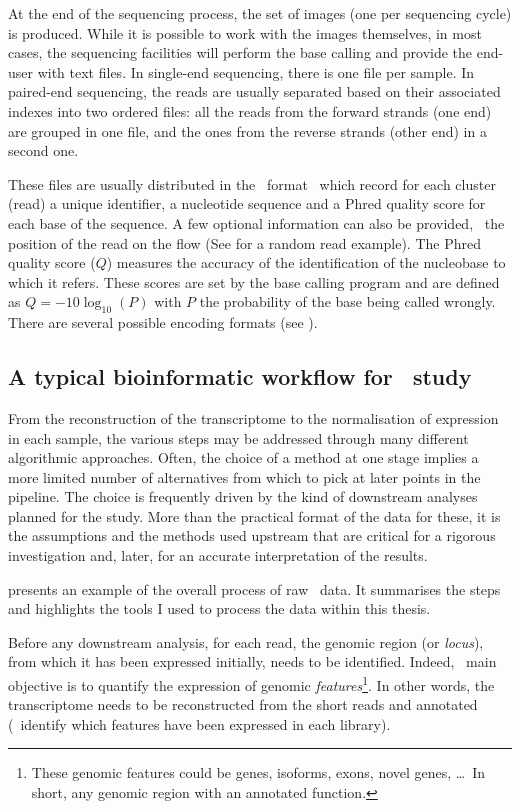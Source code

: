 At the end of the sequencing process, the set of images (one per sequencing cycle)
is produced. While it is possible to work with the images themselves, in most
cases, the sequencing facilities will perform the base calling and provide the
end-user with text files. In single-end sequencing, there is one file per sample.
In paired-end sequencing, the reads are usually separated based on their associated
indexes into two ordered files: all the reads from the forward strands (one end)
are grouped in one file, and the ones from the reverse strands (other end)
in a second one.

These files are usually distributed in the \fastq\ format~
which record for each cluster (read) a unique identifier,
a nucleotide sequence and a \gls{Phred} quality score for each base of the
sequence. A few optional information can also be provided, \eg\
the position of the read on the \gls{flow} (See  for
a random read example).
The \gls{Phred} quality score ($Q$) measures the accuracy of the identification
of the nucleobase to which it refers. These scores are set by the base calling
program and are defined as $Q = -10\log_{10}(P)$ with $P$ the probability of
the base being called wrongly. There are several possible encoding formats
(see \Cref{sec:PhredScore}).

\subsection{A typical bioinformatic workflow for \Rnaseq\ study\quad}\label{sub:RNAseqworflow}

From the reconstruction of the
transcriptome to the normalisation of expression in each sample, the various
steps may be addressed through many different algorithmic approaches.
Often, the choice of a method at one stage implies a more limited number of
alternatives from which to pick at later points in the pipeline.
The choice is frequently driven by the kind of downstream analyses planned for
the study. More than the practical format of the data for these, it is the
assumptions and the methods used upstream that are critical for a
rigorous investigation and, later, for an accurate interpretation of the results.

 presents an example of the overall 
process of raw \Rnaseq\ data. It summarises the steps and highlights the tools
I used to process the data within this thesis.

Before any downstream analysis, for each read, the genomic region (or
\emph{locus}), from which it has been expressed initially, needs to be identified.
Indeed, \Rnaseq\ main objective is to quantify the expression of genomic
\emph{features}\footnote{These genomic features could be genes, isoforms,
exons, novel genes, \dots\
In short, any genomic region with an annotated function.}. In other words,
the transcriptome needs to be reconstructed from the short reads and annotated
(\ie\ identify which features have been expressed in each library).

